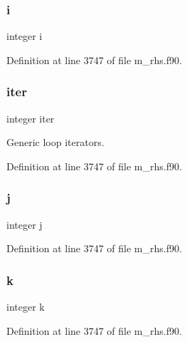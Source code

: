 \subsubsection{\texorpdfstring{i}{i}}
{\footnotesize\ttfamily integer i}



Definition at line 3747 of file m\+\_\+rhs.\+f90.

\mbox{\label{m__rhs_8f90_ae0579cdf6d579b6ff5e6a5945a99c42c}} 
\subsubsection{\texorpdfstring{iter}{iter}}
{\footnotesize\ttfamily integer iter}



Generic loop iterators. 



Definition at line 3747 of file m\+\_\+rhs.\+f90.

\mbox{\label{m__rhs_8f90_aeadbc0ce9b66517f8fde156199772ec1}} 
\subsubsection{\texorpdfstring{j}{j}}
{\footnotesize\ttfamily integer j}



Definition at line 3747 of file m\+\_\+rhs.\+f90.

\mbox{\label{m__rhs_8f90_af22c486581933c52df7d4aa306382074}} 
\subsubsection{\texorpdfstring{k}{k}}
{\footnotesize\ttfamily integer k}



Definition at line 3747 of file m\+\_\+rhs.\+f90.

\mbox{\label{m__rhs_8f90_a2ac747380de0e6e5e11b01f4137fb75c}} 
